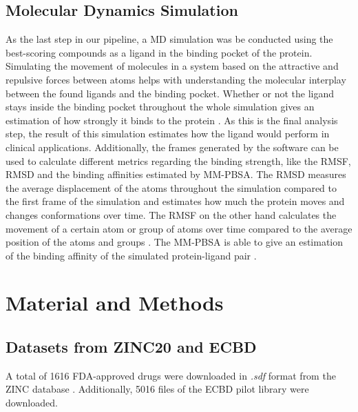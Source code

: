 \documentclass[11pt, letterpaper, titlepage]{article}
\renewcommand{\cite}{\parencite}
\begin{document}
\subsection{Molecular Dynamics Simulation}
As the last step in our pipeline, a \ac{MD} simulation was be conducted using the best-scoring compounds as a ligand in the binding pocket of the protein. Simulating the movement of molecules in a system based on the attractive and repulsive forces between atoms helps with understanding the molecular interplay between the found ligands and the binding pocket. Whether or not the ligand stays inside the binding pocket throughout the whole simulation gives an estimation of how strongly it binds to the protein \cite{MD_Basics}. As this is the final analysis step, the result of this simulation estimates how the ligand would perform in clinical applications. Additionally, the frames generated by the software can be used to calculate different metrics regarding the binding strength, like the \ac{RMSF}, \ac{RMSD} and the binding affinities estimated by \ac{MM-PBSA}. The \ac{RMSD} measures the average displacement of the atoms throughout the simulation compared to the first frame of the simulation and estimates how much the protein moves and changes conformations over time. The \ac{RMSF} on the other hand calculates the movement of a certain atom or group of atoms over time compared to the average position of the atoms and groups \cite{RMSD_RMSF}. The \ac{MM-PBSA} is able to give an estimation of the binding affinity of the simulated protein-ligand pair \cite{MM_PBSA}.


\section{Material and Methods}
\subsection{Datasets from ZINC20 and ECBD}
A total of 1616 \ac{FDA}-approved drugs were downloaded in \textit{.sdf} format from the ZINC database \cite{Irwin.2020}. Additionally, 5016 files of the \ac{ECBD} pilot library were downloaded.
\end{document}
